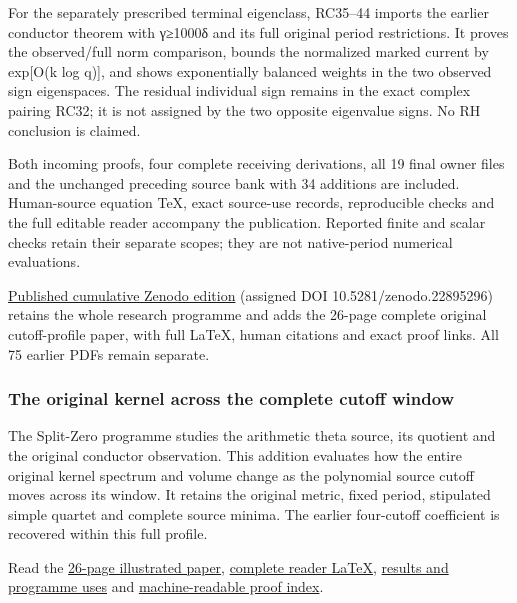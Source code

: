 \documentclass[
]{article}
\begin{document}
For the separately prescribed terminal eigenclass, RC35--44 imports the
earlier conductor theorem with γ≥1000δ and its full original period
restrictions. It proves the observed/full norm comparison, bounds the
normalized marked current by exp{[}O(k log q){]}, and shows
exponentially balanced weights in the two observed sign eigenspaces. The
residual individual sign remains in the exact complex pairing RC32; it
is not assigned by the two opposite eigenvalue signs. No RH conclusion
is claimed.

Both incoming proofs, four complete receiving derivations, all 19 final
owner files and the unchanged preceding source bank with 34 additions
are included. Human-source equation TeX, exact source-use records,
reproducible checks and the full editable reader accompany the
publication. Reported finite and scalar checks retain their separate
scopes; they are not native-period numerical evaluations.

\href{https://zenodo.org/records/22895296}{Published cumulative Zenodo
edition} (assigned DOI 10.5281/zenodo.22895296) retains the whole
research programme and adds the 26-page complete original cutoff-profile
paper, with full LaTeX, human citations and exact proof links. All 75
earlier PDFs remain separate.

\subsubsection{The original kernel across the complete cutoff
window}\label{the-original-kernel-across-the-complete-cutoff-window}

The Split-Zero programme studies the arithmetic theta source, its
quotient and the original conductor observation. This addition evaluates
how the entire original kernel spectrum and volume change as the
polynomial source cutoff moves across its window. It retains the
original metric, fixed period, stipulated simple quartet and complete
source minima. The earlier four-cutoff coefficient is recovered within
this full profile.

Read the
\href{https://github.com/KokunoYumeto/zeta-function-research-reader/blob/main/workbenches/splitzero-tandem/continuations/20260922-cutoff-profile/CUTOFF_PROFILE_READER.pdf}{26-page
illustrated paper},
\href{https://github.com/KokunoYumeto/zeta-function-research-reader/blob/main/workbenches/splitzero-tandem/continuations/20260922-cutoff-profile/CUTOFF_PROFILE_READER.tex}{complete
reader LaTeX},
\href{https://github.com/KokunoYumeto/zeta-function-research-reader/blob/main/workbenches/splitzero-tandem/continuations/20260922-cutoff-profile/RESULTS_20260922_025.md}{results
and programme uses} and
\href{https://github.com/KokunoYumeto/zeta-function-research-reader/blob/main/workbenches/splitzero-tandem/continuations/20260922-cutoff-profile/RESULT_INDEX.json}{machine-readable
proof index}.
\end{document}
